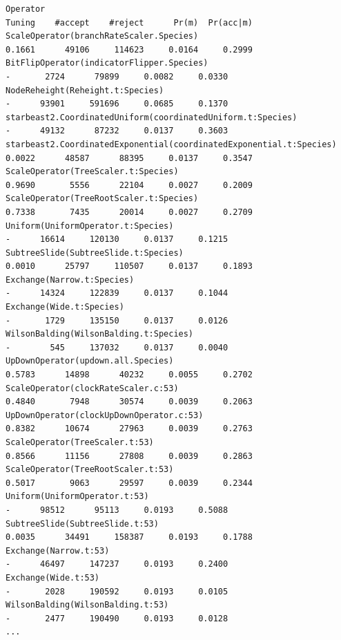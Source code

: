 \documentclass{article}
\begin{document}
{\begin{verbatim}
Operator                                                                Tuning    #accept    #reject      Pr(m)  Pr(acc|m)
ScaleOperator(branchRateScaler.Species)                                 0.1661      49106     114623     0.0164     0.2999 
BitFlipOperator(indicatorFlipper.Species)                                    -       2724      79899     0.0082     0.0330 
NodeReheight(Reheight.t:Species)                                             -      93901     591696     0.0685     0.1370 
starbeast2.CoordinatedUniform(coordinatedUniform.t:Species)                  -      49132      87232     0.0137     0.3603 
starbeast2.CoordinatedExponential(coordinatedExponential.t:Species)     0.0022      48587      88395     0.0137     0.3547 
ScaleOperator(TreeScaler.t:Species)                                     0.9690       5556      22104     0.0027     0.2009 
ScaleOperator(TreeRootScaler.t:Species)                                 0.7338       7435      20014     0.0027     0.2709 
Uniform(UniformOperator.t:Species)                                           -      16614     120130     0.0137     0.1215 
SubtreeSlide(SubtreeSlide.t:Species)                                    0.0010      25797     110507     0.0137     0.1893 
Exchange(Narrow.t:Species)                                                   -      14324     122839     0.0137     0.1044 
Exchange(Wide.t:Species)                                                     -       1729     135150     0.0137     0.0126 
WilsonBalding(WilsonBalding.t:Species)                                       -        545     137032     0.0137     0.0040 
UpDownOperator(updown.all.Species)                                      0.5783      14898      40232     0.0055     0.2702 
ScaleOperator(clockRateScaler.c:53)                                     0.4840       7948      30574     0.0039     0.2063 
UpDownOperator(clockUpDownOperator.c:53)                                0.8382      10674      27963     0.0039     0.2763 
ScaleOperator(TreeScaler.t:53)                                          0.8566      11156      27808     0.0039     0.2863 
ScaleOperator(TreeRootScaler.t:53)                                      0.5017       9063      29597     0.0039     0.2344 
Uniform(UniformOperator.t:53)                                                -      98512      95113     0.0193     0.5088 
SubtreeSlide(SubtreeSlide.t:53)                                         0.0035      34491     158387     0.0193     0.1788 
Exchange(Narrow.t:53)                                                        -      46497     147237     0.0193     0.2400 
Exchange(Wide.t:53)                                                          -       2028     190592     0.0193     0.0105 
WilsonBalding(WilsonBalding.t:53)                                            -       2477     190490     0.0193     0.0128 
...


\end{verbatim}}
\end{document}
